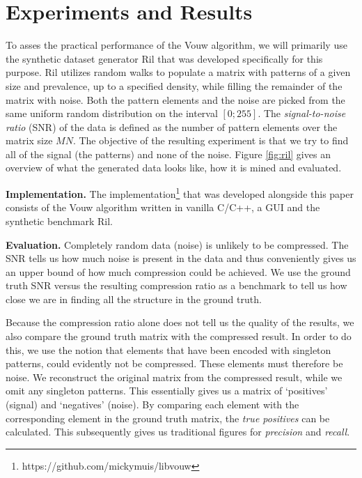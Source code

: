 \documentclass{llncs}
\begin{document}
\section{Experiments and Results}

To asses the practical performance of the Vouw algorithm, we will primarily use the synthetic dataset generator Ril that was developed specifically for this purpose. Ril utilizes random walks to populate a matrix with patterns of a given size and prevalence, up to a specified density, while filling the remainder of the matrix with noise. Both the pattern elements and the noise are picked from the same uniform random distribution on the interval $[0;255]$. The \emph{signal-to-noise ratio} (SNR) of the data is defined as the number of pattern elements over the matrix size $MN$. The objective of the resulting experiment is that we try to find all of the signal (the patterns) and none of the noise. Figure \ref{fig:ril} gives an overview of what the generated data looks like, how it is mined and evaluated.

\smallskip \noindent \textbf{Implementation.} %
The implementation\footnote{https://github.com/mickymuis/libvouw} that was developed alongside this paper consists of the Vouw algorithm written in vanilla C/C++, a GUI and the synthetic benchmark Ril. 

\smallskip \noindent \textbf{Evaluation.} %
Completely random data (noise) is unlikely to be compressed. The SNR tells us how much noise is present in the data and thus conveniently gives us an upper bound of how much compression could be achieved. We use the ground truth SNR versus the resulting compression ratio as a benchmark to tell us how close we are in finding all the structure in the ground truth. 

Because the compression ratio alone does not tell us the quality of the results, we also compare the ground truth matrix with the compressed result. In order to do this, we use the notion that elements that have been encoded with singleton patterns, could evidently not be compressed. These elements must therefore be noise. We reconstruct the original matrix from the compressed result, while we omit any singleton patterns. This essentially gives us a matrix of `positives' (signal) and `negatives' (noise). By comparing each element with the corresponding element in the ground truth matrix, the \emph{true positives} can be calculated. This subsequently gives us traditional figures for \emph{precision} and \emph{recall}.
\end{document}
